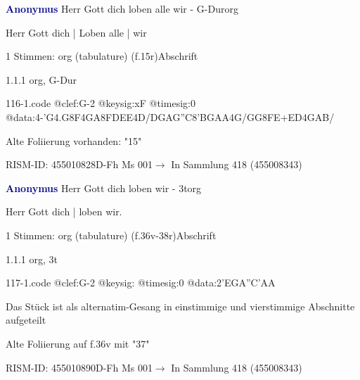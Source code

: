 \documentclass[twocolumn, 12pt]{book}
\begin{document}
\par \vspace{16pt} \textcolor{darkblue}{\textbf{Anonymus  }}\hfillplus{\textbf{[116]}}\newline Herr Gott dich loben alle wir - G-Dur\newline org
\par \begin{itshape}[f.15r, at left:] Herr Gott dich | Loben alle | wir\end{itshape} 
\par \textcolor{darkblue}{}  1 Stimmen: org (tabulature)  (f.15r)\newline Abschrift
\par 1.1.1  org, G-Dur  
\begin{filecontents*}{116-1.code}
@clef:G-2
@keysig:xF
@timesig:0
@data:4-'G4.G8F4GA{8FDEE}4D/DGAG''C{8'BGAA}4G/GG{8FE+}{ED}4GAB/
\end{filecontents*}
\newline %
\par Alte Foliierung vorhanden: "15"
\par RISM-ID: 455010828\newline D-Fh  Ms 001\newline $\rightarrow$ In Sammlung 418 (455008343)
      
\par \vspace{16pt} \textcolor{darkblue}{\textbf{Anonymus  }}\hfillplus{\textbf{[117]}}\newline Herr Gott dich loben wir - 3t\newline org
\par \begin{itshape}[f.36v, at left:] Herr Gott dich | loben wir.\end{itshape} 
\par \textcolor{darkblue}{}  1 Stimmen: org (tabulature)  (f.36v-38r)\newline Abschrift
\par 1.1.1  org, 3t  
\begin{filecontents*}{117-1.code}
@clef:G-2
@keysig:
@timesig:0
@data:2'EGA''C'AA
\end{filecontents*}
\newline %
\par Das Stück ist als alternatim-Gesang in einstimmige und vierstimmige Abschnitte aufgeteilt
\par Alte Foliierung auf f.36v mit "37"
\par RISM-ID: 455010890\newline D-Fh  Ms 001\newline $\rightarrow$ In Sammlung 418 (455008343)
      
\end{document}
